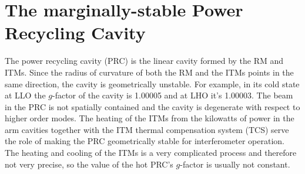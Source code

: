 







\section{The marginally-stable Power Recycling Cavity}
The power recycling cavity (PRC) is the linear cavity formed by the RM
and ITMs. Since the radius of curvature of both the RM and the ITMs
points in the same direction, the cavity is geometrically
unstable. For example, in its cold state at LLO the $g$-factor of the
cavity is 1.00005 and at LHO it's 1.00003. The beam in the PRC is not
spatially contained and the cavity is degenerate with respect to
higher order modes. The heating of the ITMs from the kilowatts of
power in the arm cavities together with the ITM thermal compensation
system (TCS) serve the role of making the PRC geometrically stable for
interferometer operation. The heating and cooling of the ITMs is a
very complicated process and therefore not very precise, so the value
of the hot PRC's $g$-factor is usually not constant.


